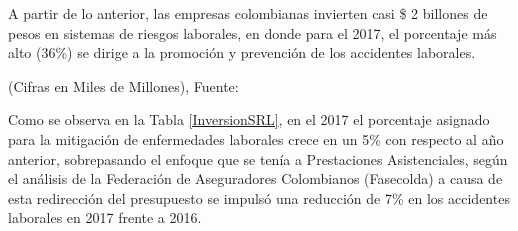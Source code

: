 A partir de lo anterior, las empresas colombianas invierten casi \$ 2 billones de pesos en sistemas de riesgos laborales, en donde para el 2017, el porcentaje más alto (36\%) se dirige a la promoción y prevención de los accidentes laborales. 
\begin{table}[H]
\centering
\footnotesize{(Cifras en Miles de Millones), Fuente: \cite{RevistaDinero2018ReduciendoColombianas}}
\caption{Inversión en Sistemas de Riesgos Laborales (2016 vs 2017)}
\label{InversionSRL}
\end{table}

Como se observa en la Tabla \ref{InversionSRL}, en el 2017 el porcentaje asignado para la mitigación de enfermedades laborales crece en un 5\% con respecto al año anterior, sobrepasando el enfoque que se tenía a Prestaciones Asistenciales, según el análisis de la Federación de Aseguradores Colombianos (Fasecolda) a causa de esta redirección del presupuesto se impulsó una reducción de 7\% en los accidentes laborales en 2017 frente a 2016.\parencite{RevistaDinero2018ReduciendoColombianas} 

